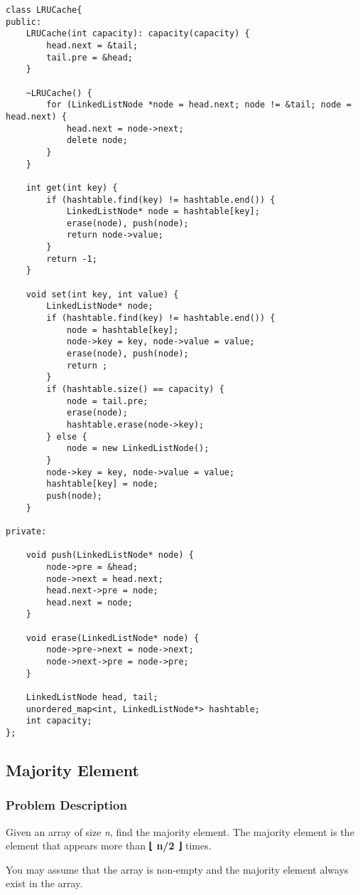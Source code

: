 \documentclass[courier]{article}
\begin{document}
\begin{CJK*}{UTF8}{gkai}
\begin{lstlisting}
class LRUCache{
public:
    LRUCache(int capacity): capacity(capacity) {
        head.next = &tail;
        tail.pre = &head;
    }

    ~LRUCache() {
    	for (LinkedListNode *node = head.next; node != &tail; node = head.next) {
    		head.next = node->next;
    		delete node;
    	}
    }

    int get(int key) {
        if (hashtable.find(key) != hashtable.end()) {
            LinkedListNode* node = hashtable[key];
            erase(node), push(node);
            return node->value;
        }
        return -1;
    }
    
    void set(int key, int value) {
        LinkedListNode* node;
        if (hashtable.find(key) != hashtable.end()) {
            node = hashtable[key];
            node->key = key, node->value = value;
            erase(node), push(node);
            return ;
        }
        if (hashtable.size() == capacity) {
            node = tail.pre;
            erase(node);
            hashtable.erase(node->key);
        } else {
            node = new LinkedListNode();
        }
        node->key = key, node->value = value;
        hashtable[key] = node;
        push(node);
    }
    
private:
    
    void push(LinkedListNode* node) {
        node->pre = &head;
        node->next = head.next;
        head.next->pre = node;
        head.next = node;
    }
    
    void erase(LinkedListNode* node) {
        node->pre->next = node->next;
        node->next->pre = node->pre;
    }
    
    LinkedListNode head, tail;
    unordered_map<int, LinkedListNode*> hashtable;
    int capacity;
};

\end{lstlisting}


\subsection{ Majority Element }

\subsubsection*{Problem Description}
Given an array of size \emph{n}, find the majority element. The majority element is the element that appears more than \textbf{⌊ n/2 ⌋} times.

You may assume that the array is non-empty and the majority element always exist in the array.


\end{CJK*}
\end{document}
